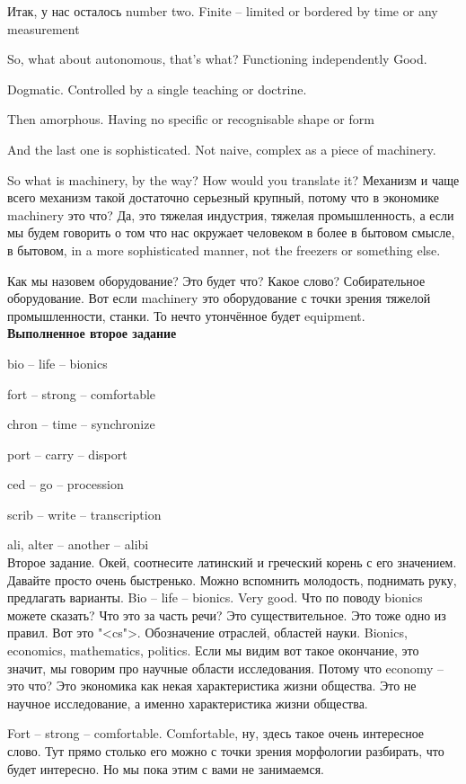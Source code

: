 \documentclass[main.tex]{subfiles}
\begin{document}
Итак, у нас осталось number two.
Finite -- limited or bordered by time or any measurement

So, what about autonomous, that's what?
Functioning independently
Good.

Dogmatic.
Controlled by a single teaching or doctrine.

Then amorphous.
Having no specific or recognisable shape or form

And the last one is sophisticated.
Not naive, complex as a piece of machinery.

So what is machinery, by the way?
How would you translate it?
Механизм и чаще всего механизм такой достаточно серьезный крупный, потому что в экономике machinery это что?
Да, это тяжелая индустрия, тяжелая промышленность, а если мы будем говорить о том что нас окружает человеком в более в бытовом смысле, в бытовом, in a more sophisticated manner, not the freezers or something else.

Как мы назовем оборудование? Это будет что? Какое слово? Собирательное оборудование.
Вот если machinery это оборудование с точки зрения тяжелой промышленности, станки.
То нечто утончённое будет equipment.
\\

\textbf{Выполненное второе задание}

bio -- life -- bionics

fort -- strong -- comfortable

chron -- time -- synchronize

port -- carry -- disport

ced -- go -- procession

scrib -- write -- transcription

ali, alter -- another -- alibi
\\

Второе задание.
Окей, соотнесите латинский и греческий корень с его значением.
Давайте просто очень быстренько.
Можно вспомнить молодость, поднимать руку, предлагать варианты.
Bio -- life -- bionics.
Very good.
Что по поводу bionics можете сказать?
Что это за часть речи?
Это существительное.
Это тоже одно из правил.
Вот это "<cs">.
Обозначение отраслей, областей науки.
Bionics, economics, mathematics, politics.
Если мы видим вот такое окончание, это значит, мы говорим про научные области исследования.
Потому что economy -- это что?
Это экономика как некая характеристика жизни общества.
Это не научное исследование, а именно характеристика жизни общества.

Fort -- strong -- comfortable.
Comfortable, ну, здесь такое очень интересное слово.
Тут прямо столько его можно с точки зрения морфологии разбирать, что будет интересно.
Но мы пока этим с вами не занимаемся.
\end{document}
